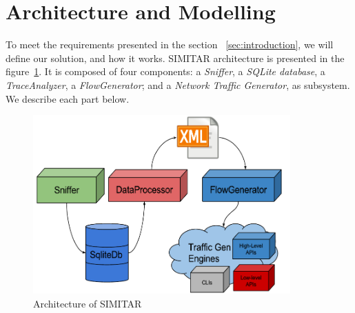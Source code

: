 




\section{Architecture and Modelling}\label{sec:architecture}

To meet the requirements presented in the section ~\ref{sec:introduction}, we will define our solution, and how it works. SIMITAR architecture is presented in the figure~\ref{fig:architecture}. It is composed of four components: a \textit{Sniffer}, a \textit{SQLite database}, a \textit{TraceAnalyzer}, a \textit{FlowGenerator};  and a \textit{Network Traffic Generator}, as subsystem. We describe each part below.

\begin{figure}[ht!]
        \centering
        \includegraphics[height=2.7in]{figures/architecture-diagram}
        \caption{Architecture of SIMITAR}
    \label{fig:architecture}
\end{figure}


